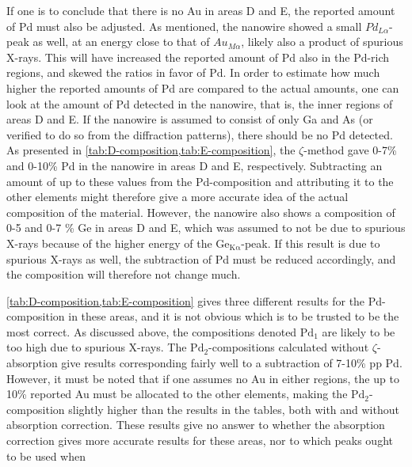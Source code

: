 If one is to conclude that there is no Au in areas D and E, the reported amount of Pd must also be adjusted. As mentioned, the nanowire showed a small $Pd_{L\alpha}$-peak as well, at an energy close to that of $Au_{M\alpha}$, likely also a product of spurious X-rays. This will have increased the reported amount of Pd also in the Pd-rich regions, and skewed the ratios in favor of Pd. In order to estimate how much higher the reported amounts of Pd are compared to the actual amounts, one can look at the amount of Pd detected in the nanowire, that is, the inner regions of areas D and E. If the nanowire is assumed to consist of only Ga and As (or verified to do so from the diffraction patterns), there should be no Pd detected. As presented in \cref{tab:D-composition,tab:E-composition}, the $\zeta$-method gave 0-7\% and 0-10\% Pd in the nanowire in areas D and E, respectively. Subtracting an amount of up to these values from the Pd-composition and attributing it to the other elements might therefore give a more accurate idea of the actual composition of the material. However, the nanowire also shows a composition of 0-5 and 0-7 \% Ge in areas D and E, which was assumed to not be due to spurious X-rays because of the higher energy of the $\mathrm{Ge_{K\alpha}}$-peak. If this result is due to spurious X-rays as well, the subtraction of Pd must be reduced accordingly, and the composition will therefore not change much. 

\cref{tab:D-composition,tab:E-composition} gives three different results for the Pd-composition in these areas, and it is not obvious which is to be trusted to be the most correct. As discussed above, the compositions denoted $\mathrm{Pd}_1$ are likely to be too high due to spurious X-rays. The Pd$_2$-compositions calculated without $\zeta$-absorption give results corresponding fairly well to a subtraction of 7-10\% pp Pd. However, it must be noted that if one assumes no Au in either regions, the up to 10\% reported Au must be allocated to the other elements, making the $\mathrm{Pd}_2$-composition slightly higher than the results in the tables, both with and without absorption correction. These results give no answer to whether the absorption correction gives more accurate results for these areas, nor to which peaks ought to be used when 

